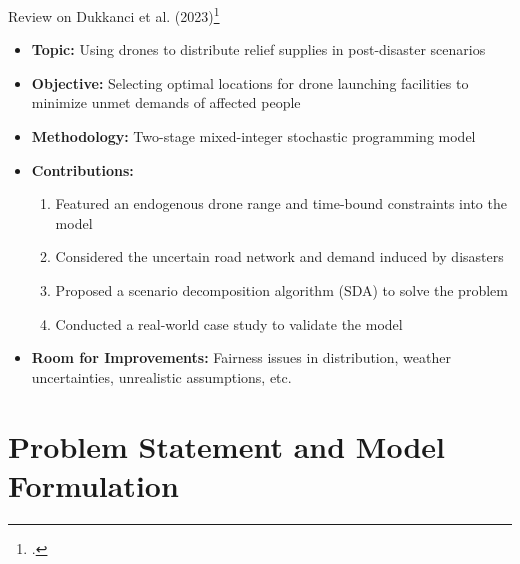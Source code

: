 \documentclass[aspectratio=169]{beamer}
\begin{document}
\begin{frame}{Review on Dukkanci et al. (2023)\footcite{dukkanci2023drones}}
  \begin{itemize}
    \item \textbf{Topic:} Using drones to distribute relief supplies in post-disaster scenarios
    \item \textbf{Objective:} Selecting optimal locations for drone launching facilities to minimize unmet demands of affected people
    \item \textbf{Methodology:} Two-stage mixed-integer stochastic programming model
    \item \textbf{Contributions:} 
      \begin{enumerate}[label=\arabic*.]
        \item Featured an endogenous drone range and time-bound constraints into the model
        \item Considered the uncertain road network and demand induced by disasters
        \item Proposed a scenario decomposition algorithm (SDA) to solve the problem
        \item Conducted a real-world case study to validate the model
      \end{enumerate}
    \item \textbf{Room for Improvements:} Fairness issues in distribution, weather uncertainties, unrealistic assumptions, etc.
  \end{itemize}
\end{frame}

\section{Problem Statement and Model Formulation}
\end{document}
